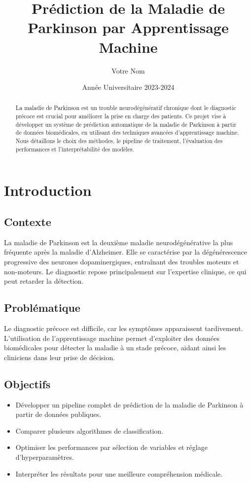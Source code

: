 \documentclass[12pt,a4paper]{report}
\title{Prédiction de la Maladie de Parkinson par Apprentissage Machine}
\author{Votre Nom}
\date{Année Universitaire 2023-2024}
\begin{document}
\maketitle

\begin{abstract}
La maladie de Parkinson est un trouble neurodégénératif chronique dont le diagnostic précoce est crucial pour améliorer la prise en charge des patients. Ce projet vise à développer un système de prédiction automatique de la maladie de Parkinson à partir de données biomédicales, en utilisant des techniques avancées d'apprentissage machine. Nous détaillons le choix des méthodes, le pipeline de traitement, l'évaluation des performances et l'interprétabilité des modèles.
\end{abstract}

\tableofcontents
\listoffigures
\listoftables

\chapter{Introduction}
\section{Contexte}
La maladie de Parkinson est la deuxième maladie neurodégénérative la plus fréquente après la maladie d'Alzheimer. Elle se caractérise par la dégénérescence progressive des neurones dopaminergiques, entraînant des troubles moteurs et non-moteurs. Le diagnostic repose principalement sur l'expertise clinique, ce qui peut retarder la détection.

\section{Problématique}
Le diagnostic précoce est difficile, car les symptômes apparaissent tardivement. L'utilisation de l'apprentissage machine permet d'exploiter des données biomédicales pour détecter la maladie à un stade précoce, aidant ainsi les cliniciens dans leur prise de décision.

\section{Objectifs}
\begin{itemize}
    \item Développer un pipeline complet de prédiction de la maladie de Parkinson à partir de données publiques.
    \item Comparer plusieurs algorithmes de classification.
    \item Optimiser les performances par sélection de variables et réglage d'hyperparamètres.
    \item Interpréter les résultats pour une meilleure compréhension médicale.
\end{itemize}
\end{document}
